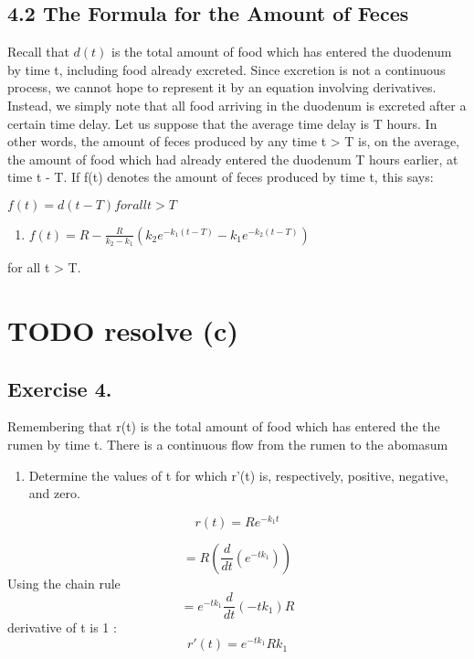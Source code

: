 \documentclass[]{article}
\providecommand{\tightlist}{%
  \setlength{\itemsep}{0pt}\setlength{\parskip}{0pt}}
\begin{document}
\subsection{4.2 The Formula for the Amount of
Feces}\label{the-formula-for-the-amount-of-feces}

Recall that \(d(t)\) is the total amount of food which has entered the
duodenum by time t, including food already excreted. Since excretion is
not a continuous process, we cannot hope to represent it by an equation
involving derivatives. Instead, we simply note that all food arriving in
the duodenum is excreted after a certain time delay. Let us suppose that
the average time delay is T hours. In other words, the amount of feces
produced by any time t \textgreater{} T is, on the average, the amount
of food which had already entered the duodenum T hours earlier, at time
t - T. If f(t) denotes the amount of feces produced by time t, this
says:

\(f(t) = d(t-T) for all t > T\)

\begin{enumerate}
\def\labelenumi{(\arabic{enumi})}
\setcounter{enumi}{9}
\tightlist
\item
  \(f(t) = R - \frac{R}{k_2-k_1}(k_2e^{-k_1(t-T)}-k_1e^{-k_2(t-T)})\)
\end{enumerate}

for all t \textgreater{} T.

\section{TODO resolve (c)}\label{todo-resolve-c}

\subsection{Exercise 4.}\label{exercise-4.}

Remembering that r(t) is the total amount of food which has entered the
the rumen by time t. There is a continuous flow from the rumen to the
abomasum

\begin{enumerate}
\def\labelenumi{(\alph{enumi})}
\tightlist
\item
  Determine the values of t for which r'(t) is, respectively, positive,
  negative, and zero.
\end{enumerate}

\[r(t) = Re^{-k_1t}\]

\[= R(\frac{d}{dt}(e^{-tk_1}))\] Using the chain rule
\[= e^{-tk_1}\frac{d}{dt}(-tk_1)R\] derivative of t is 1 :
\[r'(t)= e^{-tk_1}Rk_1\]
\end{document}
